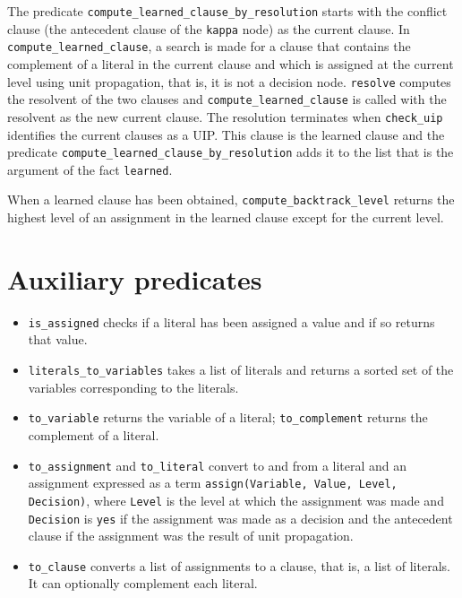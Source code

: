\documentclass[11pt]{report}
\newcommand*{\p}[1]{\textup{\texttt{#1}}}
\begin{document}
The predicate \p{compute\_learned\_clause\_by\_resolution} starts with
the conflict clause (the antecedent clause of the \p{kappa} node) as the
current clause. In \p{compute\_learned\_clause}, a search is made for a
clause that contains the complement of a literal in the current clause
and which is assigned at the current level using unit propagation, that
is, it is not a decision node. \p{resolve} computes the resolvent of the
two clauses and \p{compute\_learned\_clause} is called with the
resolvent as the new current clause. The resolution terminates when
\p{check\_uip} identifies the current clauses as a UIP. This clause is
the learned clause and the predicate
\p{compute\_learned\_clause\_by\_resolution} adds it to the list that is
the argument of the fact \p{learned}.

When a learned clause has been obtained, \p{compute\_backtrack\_level}
returns the highest level of an assignment in the learned clause except
for the current level.


\section{Auxiliary predicates}\label{s.aux}

\begin{itemize}

\item \p{is\_assigned} checks if a literal has been assigned a value
and if so returns that value.

\item \p{literals\_to\_variables} takes a list of literals and returns a
sorted set of the variables corresponding to the literals.

\item \p{to\_variable} returns the variable of a literal;
\p{to\_complement} returns the complement of a literal.

\item \p{to\_assignment} and \p{to\_literal} convert to and from a
literal and an assignment expressed as a term \p{assign(Variable, Value,
Level, Decision)}, where \p{Level} is the level at which the assignment
was made and \p{Decision} is \p{yes} if the assignment was made as a
decision and the antecedent clause if the assignment was the result of
unit propagation.

\item \p{to\_clause} converts a list of assignments to a clause, that
is, a list of literals. It can optionally complement each literal.

\end{itemize}




\end{document}
